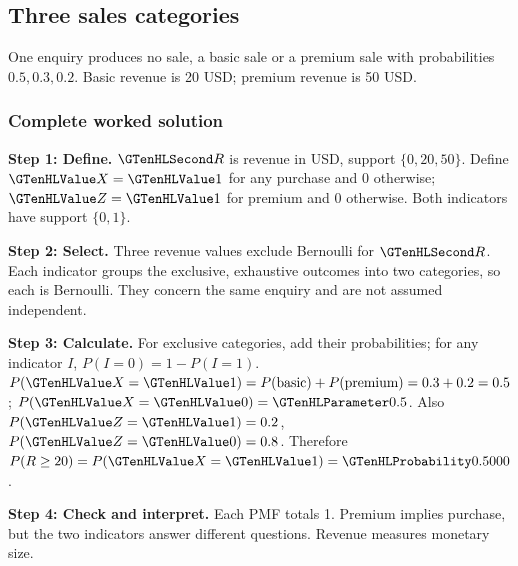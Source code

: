 \clearpage
\subsection{Three sales categories}\label{prob:c3-categories}
One enquiry produces no sale, a basic sale or a premium sale with probabilities $0.5,0.3,0.2$. Basic revenue is 20 USD; premium revenue is 50 USD.


\subsubsection*{Complete worked solution}\label{sol:c3-categories}
\par\noindent\begin{minipage}{\linewidth}
\textbf{Step 1: Define.} $\Money{R}$ is revenue in USD, support $\{0,20,50\}$. Define $\Indicator{X}=\Indicator{1}$ for any purchase and 0 otherwise; $\Indicator{Z}=\Indicator{1}$ for premium and 0 otherwise. Both indicators have support $\{0,1\}$.
\end{minipage}\par\medskip
\par\noindent\begin{minipage}{\linewidth}
\textbf{Step 2: Select.} Three revenue values exclude Bernoulli for $\Money{R}$. Each indicator groups the exclusive, exhaustive outcomes into two categories, so each is Bernoulli. They concern the same enquiry and are not assumed independent.
\end{minipage}\par\medskip
\par\noindent\begin{minipage}{\linewidth}
\textbf{Step 3: Calculate.} For exclusive categories, add their probabilities; for any indicator $I$, $P(I=0)=1-P(I=1)$. $P(\Indicator{X}=\Indicator{1})=P(\text{basic})+P(\text{premium})=0.3+0.2=0.5$; $P(\Indicator{X}=\Indicator{0})=\FailureProb{0.5}$. Also $P(\Indicator{Z}=\Indicator{1})=0.2$, $P(\Indicator{Z}=\Indicator{0})=0.8$. Therefore $P(R\geq20)=P(\Indicator{X}=\Indicator{1})=\SuccessProb{0.5000}$.
\end{minipage}\par\medskip
\par\noindent\begin{minipage}{\linewidth}
\textbf{Step 4: Check and interpret.} Each PMF totals 1. Premium implies purchase, but the two indicators answer different questions. Revenue measures monetary size.
\end{minipage}\par\medskip

